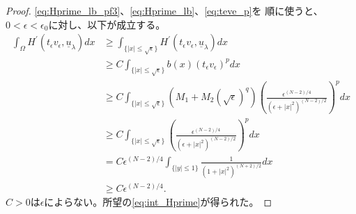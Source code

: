 \begin{proof}
 \eqref{eq:Hprime_lb_pf3}、\eqref{eq:Hprime_lb}、\eqref{eq:teve_p}を
 順に使うと、
 $0 < \epsilon < \epsilon_0$に対し、以下が成立する。
 \begin{align*}
  \int_\Omega H^\prime(t_\epsilon v_\epsilon, \underline{u}_\lambda )
  dx & \geq \int_{\{ \lvert x \rvert \leq \sqrt{\epsilon} \}} 
  H^\prime(t_\epsilon v_\epsilon, \underline{u}_\lambda ) dx \\
  & \geq C \int_{\{ \lvert x \rvert \leq \sqrt{\epsilon} \}} 
  b(x) (t_\epsilon v_\epsilon)^p dx \\
  & \geq C \int_{\{ \lvert x \rvert \leq \sqrt{\epsilon} \}} 
  (M_1 + M_2 (\sqrt{\epsilon})^q) \left(
  \frac{\epsilon^{(N-2)/4}}{(\epsilon + \lvert x \rvert^2)^{(N-2)/2}}
  \right)^p dx \\
  & \geq C \int_{\{ \lvert x \rvert \leq \sqrt{\epsilon} \}} 
  \left(
  \frac{\epsilon^{(N-2)/4}}{(\epsilon + \lvert x \rvert^2)^{(N-2)/2}}
  \right)^p dx \\
  & = C \epsilon^{(N-2)/4} \int_{ \{ \lvert y \rvert \leq 1 \}}
  \frac{1}{(1 + \lvert x \rvert^2)^{(N+2)/2}} dx \\
  & \geq C \epsilon^{(N-2)/4}.
 \end{align*}
 $C>0$は$\epsilon$によらない。所望の\eqref{eq:int_Hprime}が得られた。\qedhere
\end{proof}

